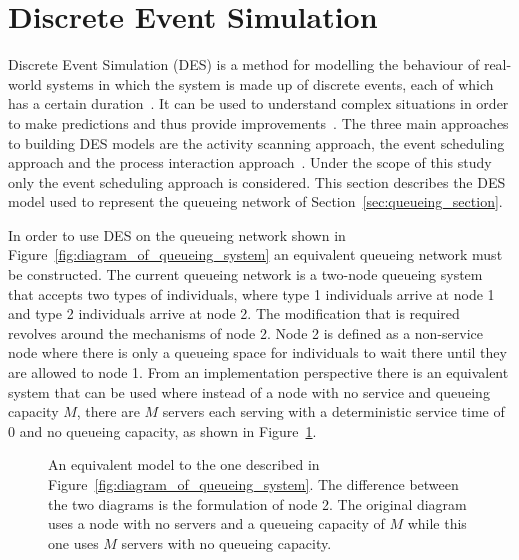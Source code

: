 \section{Discrete Event Simulation}\label{sec:discrete_event_simulation}

Discrete Event Simulation (DES) is a method for modelling the behaviour of
real-world systems in which the system is made up of discrete events, each of
which has a certain duration~\cite{DESstewart}.
It can be used to understand complex situations in order to make predictions
and thus provide improvements~\cite{VinceGeraintBook}.
The three main approaches to building DES models are the activity scanning
approach, the event scheduling approach and the process interaction
approach~\cite{DESapproaches}.
Under the scope of this study only the event scheduling approach is considered.
This section describes the DES model used to
represent the queueing network of Section~\ref{sec:queueing_section}.

In order to use DES on the queueing network shown in
Figure~\ref{fig:diagram_of_queueing_system} an equivalent queueing network must
be constructed.
The current queueing network is a two-node queueing system that accepts two
types of individuals, where type 1 individuals arrive at node 1 and
type 2 individuals arrive at node 2.
The modification that is required revolves around the mechanisms of node 2.
Node 2 is defined as a non-service node where there is only a queueing
space for individuals to wait there until they are allowed to node 1.
From an implementation perspective there is an equivalent system that can be
used where instead of a node with no service and queueing capacity \(M\), there
are \(M\) servers each serving with a deterministic service time of \(0\) and no
queueing capacity, as shown in
Figure~\ref{fig:equivalent_diagram_of_queueing_system}.

\begin{figure}[H]
    \centering
    
    \caption{An equivalent model to the one described in
    Figure~\ref{fig:diagram_of_queueing_system}. The difference between the two
    diagrams is the formulation of node 2. The original diagram uses
    a node with no servers and a queueing capacity of \(M\) while this one uses
    \(M\) servers with no queueing capacity.}
    \label{fig:equivalent_diagram_of_queueing_system}
\end{figure}
    

